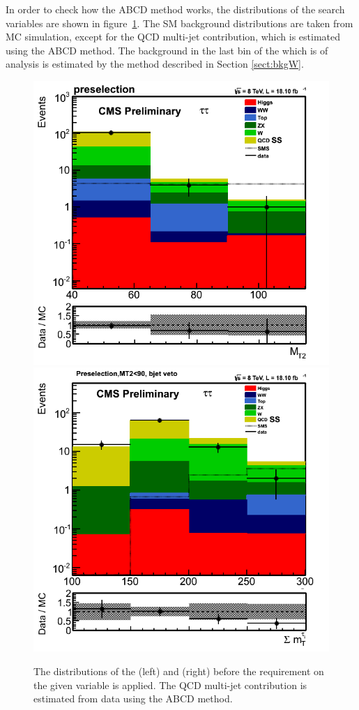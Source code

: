 In order to check how the ABCD method works, the distributions of the search variables are shown in 
figure~\ref{fig:5QCDbg}. The SM background distributions are taken from MC simulation, except for 
the QCD multi-jet contribution, which is estimated using the ABCD method. The \wjets background in the last bin of the \mttwo which is \binone of
analysis is estimated by the method described in Section \ref{sect:bkgW}.
\begin{figure}[iHhtb]
\centering
\includegraphics[angle=0,scale=0.35]{QCDbginTauTau/QCDWestimation_bin1.png}
\includegraphics[angle=0,scale=0.35]{QCDbginTauTau/QCDWestimation_bin2.png}
\caption{The distributions of the \mttwo (left) and \SumMT (right) before the requirement on the given variable
is applied. The QCD multi-jet contribution is estimated from data using the ABCD method.}
\label{fig:5QCDbg}
\end{figure}
